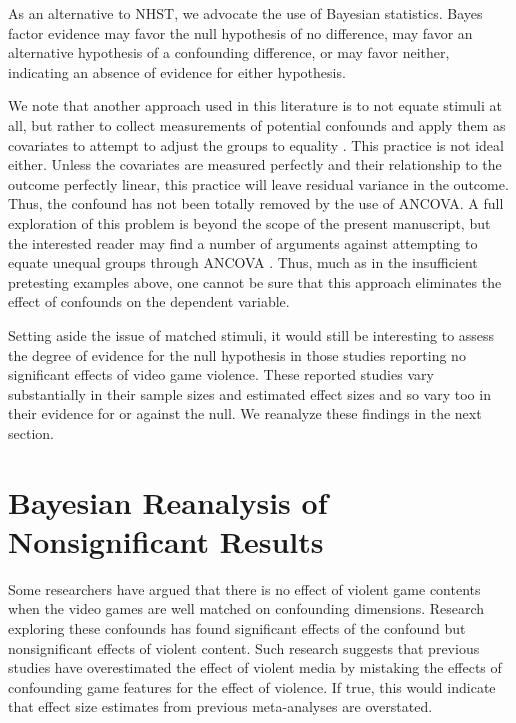 \documentclass[man]{apa6}
\begin{document}
As an alternative to NHST, we advocate the use of Bayesian statistics. Bayes factor evidence may favor the null hypothesis of no difference, may favor an alternative hypothesis of a confounding difference, or may favor neither, indicating an absence of evidence for either hypothesis. 

We note that another approach used in this literature is to not equate stimuli at all, but rather to collect measurements of potential confounds and apply them as covariates to attempt to adjust the groups to equality \citep[e.g.,][]{Bushman:Anderson:2002,Carnagey:etal:2006,Sestir:Bartholow:2010}. This practice is not ideal either. Unless the covariates are measured perfectly and their relationship to the outcome perfectly linear, this practice will leave residual variance in the outcome. Thus, the confound has not been totally removed by the use of ANCOVA. A full exploration of this problem is beyond the scope of the present manuscript, but the interested reader may find a number of arguments against attempting to equate unequal groups through ANCOVA \citep{Miller:Chapman:2001}. 
Thus, much as in the insufficient pretesting examples above, one cannot be sure that this approach eliminates the effect of confounds on the dependent variable. 

Setting aside the issue of matched stimuli, it would still be interesting to assess the degree of evidence for the null hypothesis in those studies reporting no significant effects of video game violence. These reported studies vary substantially in their sample sizes and estimated effect sizes and so vary too in their evidence for or against the null. We reanalyze these findings in the next section.

\section{Bayesian Reanalysis of Nonsignificant Results}
Some researchers have argued that there is no effect of violent game contents when the video games are well matched on confounding dimensions. Research exploring these confounds has found significant effects of the confound but nonsignificant effects of violent content. Such research suggests that previous studies have overestimated the effect of violent media by mistaking the effects of confounding game features for the effect of violence. If true, this would indicate that effect size estimates from previous meta-analyses \citep[e.g., $r = .21$ or $d = 0.43$,][]{Anderson:etal:2010} are overstated.  
\end{document}
